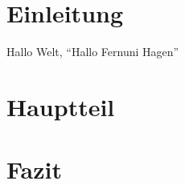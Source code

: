 \documentclass[12pt,ngerman, parskip=half]{scrreprt}
\begin{document}


\tableofcontents

\chapter{Einleitung}

Hallo Welt, \enquote{Hallo Fernuni Hagen} 

\chapter{Hauptteil}

\chapter{Fazit}
\end{document}
